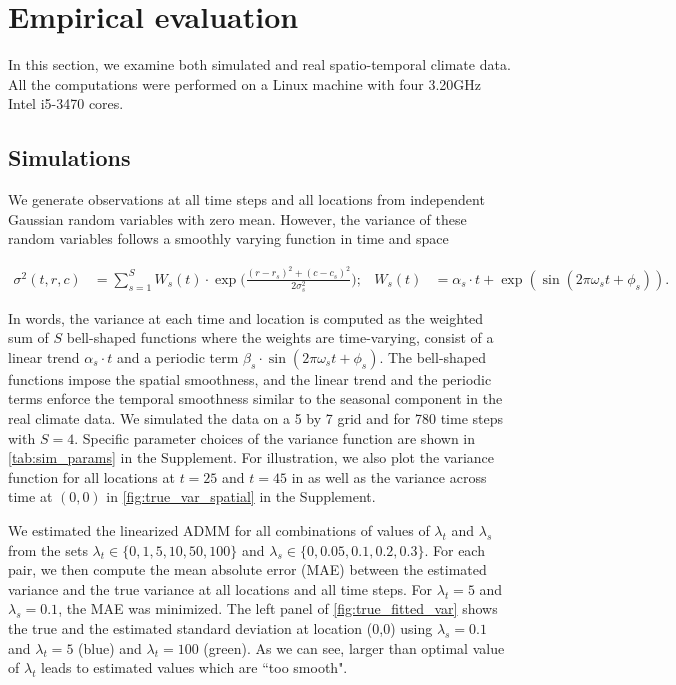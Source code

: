 \documentclass{article}
\begin{document}
\section{Empirical evaluation}
\label{sec:empirical-evaluation}

In this section, we examine both simulated and real spatio-temporal
climate data. All the computations were performed on a Linux machine
with four 3.20GHz Intel i5-3470 cores. 

\subsection{Simulations}
\label{sec:simulations}

We generate observations at all time steps and all locations from
independent Gaussian random variables with zero mean. However, the
variance of these random variables follows a smoothly varying function
in time and space

\begin{align}
\sigma^2(t,r,c) & =\sum_{s=1}^{S} W_s(t) \cdot \exp\bigg( \frac{(r-r_s)^2+(c-c_s)^2}{2\sigma_s^2} \bigg); &
W_s(t) & =\alpha_s \cdot t + \exp(\sin(2\pi\omega_s t+\phi_s)) .
\label{eq:sourceVar}
\end{align}

In words, the variance at each time and location is computed as the
weighted sum of $S$ bell-shaped functions where the weights are
time-varying, consist of a linear trend $\alpha_s \cdot t$ and a
periodic term $\beta_s \cdot \sin(2\pi\omega_s t+\phi_s)$. The
bell-shaped functions impose the spatial smoothness, and the linear
trend and the periodic terms enforce the temporal smoothness similar
to the seasonal component in the real climate data. We simulated the
data on a 5 by 7 grid and for 780 time steps with $S=4$. 
Specific parameter choices of the variance function are shown in
\autoref{tab:sim_params} in the Supplement. For illustration, we also plot the
variance function for all locations at $t=25$ and $t=45$ in as well as
the variance across time at $(0,0)$ in \autoref{fig:true_var_spatial}
in the Supplement.

We estimated the linearized ADMM for all combinations of values of
$\lambda_t$ and $\lambda_s$ from the sets $\lambda_t \in
\{0,1,5,10,50,100\}$ and $\lambda_s \in \{0,0.05,0.1,0.2,0.3\}$. For
each pair, we then compute the mean absolute error (MAE) between the
estimated variance and the true variance at all locations and all time
steps. For $\lambda_t=5$ and $\lambda_s=0.1$, the MAE was minimized. The
left panel of \autoref{fig:true_fitted_var} shows the true and the
estimated standard deviation at location (0,0) using $\lambda_s=0.1$
and $\lambda_t=5$ (blue) and $\lambda_t=100$ (green). As we can see,
larger than optimal value of $\lambda_t$ leads to estimated values
which are ``too smooth".  
\end{document}

